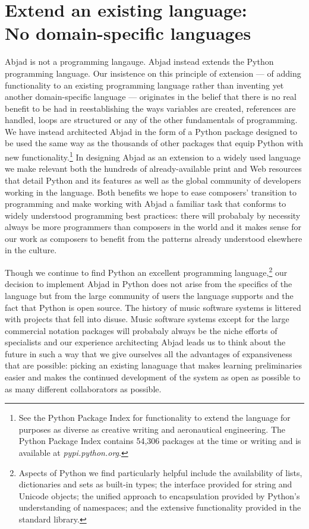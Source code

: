 \documentclass{article}
\begin{document}
\section{Extend an existing language: \\ No domain-specific languages}

Abjad is not a programming langauge. Abjad instead extends the Python
programming language. Our insistence on this principle of extension --- of
adding functionality to an existing programming language rather than inventing
yet another domain-specific language --- originates in the belief that there is
no real benefit to be had in reestablishing the ways variables are created,
references are handled, loops are structured or any of the other fundamentals
of programming. We have instead architected Abjad in the form of a Python
package designed to be used the same way as the thousands of other packages
that equip Python with new functionality.\footnote{See the Python Package Index
for functionality to extend the language for purposes as diverse as creative
writing and aeronautical engineering. The Python Package Index contains 54,306
packages at the time or writing and is available at \textit{pypi.python.org}.}
In designing Abjad as an extension to a widely used language we make relevant
both the hundreds of already-available print and Web resources that detail
Python and its features as well as the global community of developers working
in the language. Both benefits we hope to ease composers' transition to
programming and make working with Abjad a familiar task that conforms to widely
understood programming best practices: there will probabaly by necessity always
be more programmers than composers in the world and it makes sense for our work
as composers to benefit from the patterns already understood elsewhere in the
culture.

Though we continue to find Python an excellent programming
language,\footnote{Aspects of Python we find particularly helpful include the
availability of lists, dictionaries and sets as built-in types; the interface
provided for string and Unicode objects; the unified approach to encapsulation
provided by Python's understanding of namespaces; and the extensive
functionality provided in the standard library.} our decision to implement
Abjad in Python does not arise from the specifics of the language but from the
large community of users the language supports and the fact that Python is open
source. The history of music software systems is littered with projects that
fell into disuse. Music software systems except for the large commercial
notation packages will probabaly always be the niche efforts of specialists and
our experience architecting Abjad leads us to think about the future in such a
way that we give ourselves all the advantages of expansiveness that are
possible: picking an existing lanaguage that makes learning preliminaries
easier and makes the continued development of the system as open as possible to
as many different collaborators as possible.
\end{document}
